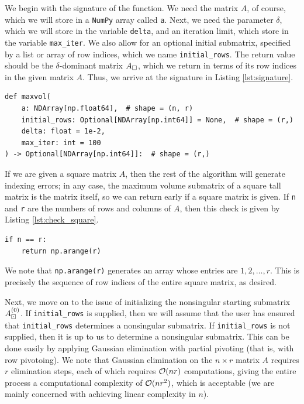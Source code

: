 \documentclass{article}
\begin{document}
	\newcommand{\va}{\texttt{a}}
	\newcommand{\vinitialrows}{\texttt{initial\_rows}}
	\newcommand{\vdelta}{\texttt{delta}}
	\newcommand{\vmaxiter}{\texttt{max\_iter}}
	
	
	We begin with the signature of the \maxvol{} function. We need the matrix $A$, of course, which we will store in a \texttt{NumPy} array called \va. Next, we need the parameter $\delta$, which we will store in the variable \vdelta, and an iteration limit, which store in the variable \vmaxiter. We also allow for an optional initial submatrix, specified by a list or array of row indices, which we name \vinitialrows. The return value should be the $\delta$-dominant matrix $A_\square$, which we return in terms of its row indices in the given matrix $A$. Thus, we arrive at the signature in Listing \ref{lst:signature}.
	\begin{lstlisting}[caption={function signature}, label=lst:signature]
def maxvol(
    a: NDArray[np.float64],  # shape = (n, r)
    initial_rows: Optional[NDArray[np.int64]] = None,  # shape = (r,)
    delta: float = 1e-2,
    max_iter: int = 100
) -> Optional[NDArray[np.int64]]:  # shape = (r,)
	\end{lstlisting}
	
	If we are given a square matrix $A$, then the rest of the algorithm will generate indexing errors; in any case, the maximum volume submatrix of a square tall matrix is the matrix itself, so we can return early if a square matrix is given. If \texttt{n} and \texttt{r} are the numbers of rows and columns of $A$, then this check is given by Listing \ref{lst:check_square}.
	\begin{lstlisting}[caption={square matrix check}, label=lst:check_square]
if n == r:
    return np.arange(r)
	\end{lstlisting}
	We note that \texttt{np.arange(r)} generates an array whose entries are $1,2,\dots, r$. This is precisely the sequence of row indices of the entire square matrix, as desired.
	
	
	Next, we move on to the issue of initializing the nonsingular starting submatrix $A_\boxdot^{(0)}$. If \vinitialrows{} is supplied, then we will assume that the user has ensured that \vinitialrows{}  determines a nonsingular submatrix. If \vinitialrows{} is not supplied, then it is up to us to determine a nonsingular submatrix. This can be done easily by applying Gaussian elimination with partial pivoting (that is, with row pivotoing). We note that Gaussian elimination on the $n\times r$ matrix $A$ requires $r$ elimination steps, each of which requires $\mathcal{O}(nr)$ computations, giving the entire process a computational complexity of $\mathcal{O}(nr^2)$, which is acceptable (we are mainly concerned with achieving linear complexity in $n$).
	
\end{document}
